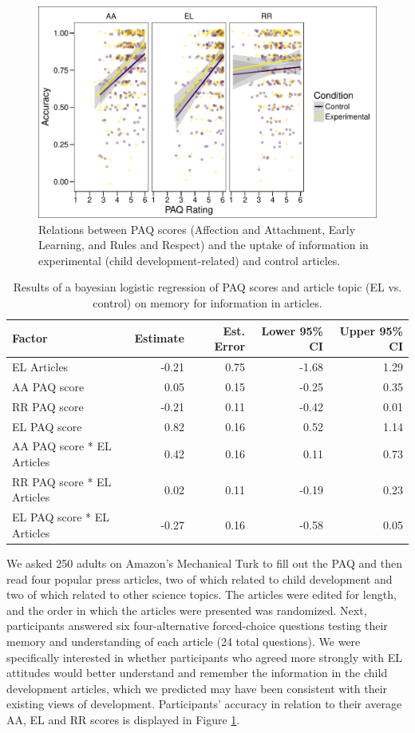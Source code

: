 \documentclass[man]{apa6}
\theoremstyle{definition}
\theoremstyle{definition}
\theoremstyle{definition}
\theoremstyle{remark}
\begin{document}
\begin{figure}
\centering
\includegraphics{PAQ_paper_files/figure-latex/uptake-1.pdf}
\caption{\label{fig:uptake}Relations between PAQ scores (Affection and
Attachment, Early Learning, and Rules and Respect) and the uptake of
information in experimental (child development-related) and control
articles.}
\end{figure}

\begin{table}[h]
\centering
\caption{Results of a bayesian logistic regression of PAQ scores and article topic (EL vs. control) on memory for information in articles.} 
\label{tab:uptake}
\begin{tabular}{lrrrr}
  \hline
Factor & Estimate & Est. Error & Lower 95\% CI & Upper 95\% CI \\ 
  \hline
EL Articles & -0.21 & 0.75 & -1.68 & 1.29 \\ 
  AA PAQ score & 0.05 & 0.15 & -0.25 & 0.35 \\ 
  RR PAQ score & -0.21 & 0.11 & -0.42 & 0.01 \\ 
  EL PAQ score & 0.82 & 0.16 & 0.52 & 1.14 \\ 
  AA PAQ score * EL Articles & 0.42 & 0.16 & 0.11 & 0.73 \\ 
  RR PAQ score * EL Articles & 0.02 & 0.11 & -0.19 & 0.23 \\ 
  EL PAQ score * EL Articles & -0.27 & 0.16 & -0.58 & 0.05 \\ 
   \hline
\end{tabular}
\end{table}

We asked 250 adults on Amazon's Mechanical Turk to fill out the PAQ and
then read four popular press articles, two of which related to child
development and two of which related to other science topics. The
articles were edited for length, and the order in which the articles
were presented was randomized. Next, participants answered six
four-alternative forced-choice questions testing their memory and
understanding of each article (24 total questions). We were specifically
interested in whether participants who agreed more strongly with EL
attitudes would better understand and remember the information in the
child development articles, which we predicted may have been consistent
with their existing views of development. Participants' accuracy in
relation to their average AA, EL and RR scores is displayed in Figure
\ref{fig:uptake}.
\end{document}
